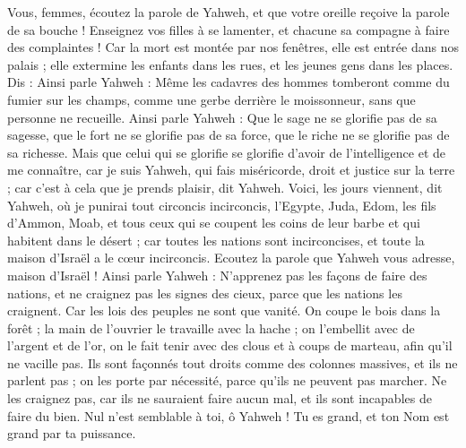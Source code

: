 \begin{multicols}{2}
Vous, femmes, écoutez la parole de Yahweh, et que votre oreille reçoive la parole de sa bouche ! Enseignez vos filles à se lamenter, et chacune sa compagne à faire des complaintes !
Car la mort est montée par nos fenêtres, elle est entrée dans nos palais ; elle extermine les enfants dans les rues, et les jeunes gens dans les places.
Dis : Ainsi parle Yahweh : Même les cadavres des hommes tomberont comme du fumier sur les champs, comme une gerbe derrière le moissonneur, sans que personne ne recueille.
Ainsi parle Yahweh : Que le sage ne se glorifie pas de sa sagesse, que le fort ne se glorifie pas de sa force, que le riche ne se glorifie pas de sa richesse.
Mais que celui qui se glorifie se glorifie d'avoir de l'intelligence et de me connaître, car je suis Yahweh, qui fais miséricorde, droit et justice sur la terre ; car c'est à cela que je prends plaisir, dit Yahweh.
Voici, les jours viennent, dit Yahweh, où je punirai tout circoncis incirconcis,
l'Egypte, Juda, Edom, les fils d'Ammon, Moab, et tous ceux qui se coupent les coins de leur barbe et qui habitent dans le désert ; car toutes les nations sont incirconcises, et toute la maison d'Israël a le cœur incirconcis.
\VerseOne{}Ecoutez la parole que Yahweh vous adresse, maison d'Israël !
Ainsi parle Yahweh : N'apprenez pas les façons de faire des nations, et ne craignez pas les signes des cieux, parce que les nations les craignent.
Car les lois des peuples ne sont que vanité. On coupe le bois dans la forêt ; la main de l'ouvrier le travaille avec la hache ;
on l'embellit avec de l'argent et de l'or, on le fait tenir avec des clous et à coups de marteau, afin qu'il ne vacille pas.
Ils sont façonnés tout droits comme des colonnes massives, et ils ne parlent pas ; on les porte par nécessité, parce qu'ils ne peuvent pas marcher. Ne les craignez pas, car ils ne sauraient faire aucun mal, et ils sont incapables de faire du bien.
Nul n'est semblable à toi, ô Yahweh ! Tu es grand, et ton Nom est grand par ta puissance.

\end{multicols}
